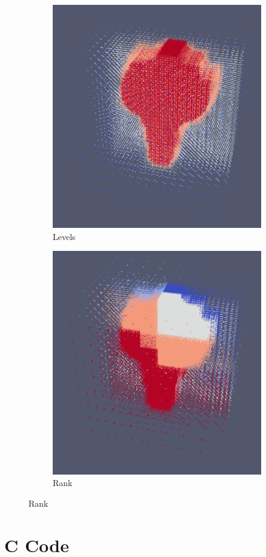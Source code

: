 \documentclass[12pt,letterpaper]{article}
\begin{document}
\begin{figure}[ht]
\centering
\caption{Octree}
\label{octree}
\begin{subfigure}[b]{0.45\textwidth}
\caption{Levels}
\label{oct_levels}
\includegraphics[width=\textwidth]{oct_level.png}
\end{subfigure}
\begin{subfigure}[b]{0.45\textwidth}
\caption{Rank}
\label{oct_rank}
\includegraphics[width=\textwidth]{oct_rank.png}
\end{subfigure}
\end{figure}

\section{C Code}


\end{document}
